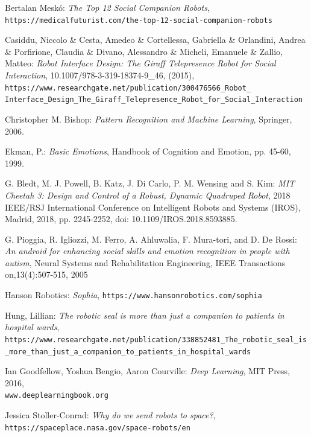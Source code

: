 \documentclass[runningheads,a4paper,12pt]{report}
\begin{document}
\begin{thebibliography}{9}

Bertalan Mesk\'o:
\textit{The Top 12 Social Companion Robots},
\texttt{https://medicalfuturist.com/the-top-12-social-companion-robots}

Casiddu, Niccolo \& Cesta, Amedeo \& Cortellessa, Gabriella \& Orlandini, Andrea \& Porfirione, Claudia \& Divano, Alessandro \& Micheli, Emanuele \& Zallio, Matteo: 
\textit{Robot Interface Design: The Giraff Telepresence Robot for Social Interaction}, 10.1007/978-3-319-18374-9\_46, (2015),
\texttt{https://www.researchgate.net/publication/300476566\_Robot\_
Interface\_Design\_The\_Giraff\_Telepresence\_Robot\_for\_Social\_Interaction}

Christopher M. Bishop:
\textit{Pattern Recognition and Machine Learning}, 
Springer,
2006.

Ekman, P.: 
\textit{Basic Emotions}, Handbook of Cognition and Emotion, pp. 45-60, 1999.

G. Bledt, M. J. Powell, B. Katz, J. Di Carlo, P. M. Wensing and S. Kim:
\textit{MIT Cheetah 3: Design and Control of a Robust, Dynamic Quadruped Robot}, 
2018 IEEE/RSJ International Conference on Intelligent Robots and Systems (IROS), Madrid, 2018, pp. 2245-2252, doi: 10.1109/IROS.2018.8593885.

G. Pioggia, R. Igliozzi, M. Ferro, A. Ahluwalia, F. Mura-tori, and D. De Rossi:
\textit{An android for enhancing social skills and emotion recognition in people with autism},
Neural Systems and Rehabilitation Engineering, IEEE Transactions on,13(4):507-515, 2005

Hanson Robotics:
\textit{Sophia},
\texttt{https://www.hansonrobotics.com/sophia}

Hung, Lillian:
\textit{The robotic seal is more than just a companion to patients in hospital wards}, \texttt{https://www.researchgate.net/publication/338852481\_The\_robotic\_seal\_is\_more\_than\_just\_a\_companion\_to\_patients\_in\_hospital\_wards}

Ian Goodfellow, Yoshua Bengio, Aaron Courville:
\textit{Deep Learning},
MIT Press,
2016,
\\\texttt{www.deeplearningbook.org}

Jessica Stoller-Conrad:
\textit{Why do we send robots to space?}, 
\texttt{https://spaceplace.nasa.gov/space-robots/en}


\end{thebibliography}
\end{document}
